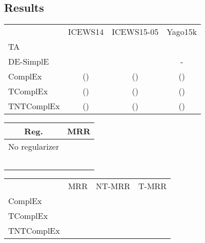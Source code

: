 \documentclass{article}
\begin{document}
\subsection{Results}


\begin{table*}[t]
\begin{minipage}{0.7\linewidth}
\centering
\begin{tabular}{lccc}
\toprule
{} &  ICEWS14 & ICEWS15-05 & Yago15k\\
TA &  &  &  \\
DE-SimplE &  &  & - \\
ComplEx &  () &  () &  () \\
\midrule
TComplEx &  ()&  ()&  () \\
TNTComplEx &  ()&  () &  ()\\
\bottomrule
\end{tabular}
\caption{Results for TA \citep{garcia2018learning} and DE-SimplE \citep{goel2019diachronic} are the best numbers reported in the respective papers. Our models have as many parameters as DE-SimplE. Numbers in parentheses are for ranks multiplied by .\label{tab:res}}
\end{minipage}
\hfill
\begin{minipage}{0.25\linewidth}
\centering
\begin{tabular}{c|c}
\toprule
Reg. & MRR\\ \midrule
No regularizer &   \\
 &  \\
 &   \\
 & \\
 & \\
 & \\
\bottomrule
\end{tabular}
\caption{Impact of regularizers on ICEWS05-15 for TNTComplEx.\label{tab:ablation}}
\end{minipage}
\end{table*}

\begin{table*}[b]
\centering
\begin{tabular}{lccc}
\toprule
{} &  MRR & NT-MRR & T-MRR \\
ComplEx &  &  & \\
\midrule
TComplEx &  &  &  \\
TNTComplEx &  &  &  \\
\bottomrule
\end{tabular}
\caption{Results on wikidata for entity dimension .}
\label{tab:res_wikidata}
\end{table*}
\end{document}
